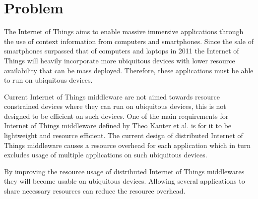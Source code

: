 \section{Problem}
\label{problem}
The Internet of Things aims to enable massive immersive applications through the use of context information from computers and smartphones. Since the sale of smartphones surpassed that of computers and laptops in 2011 \cite{canalsys} the Internet of Things will heavily incorporate more ubiquitous devices with lower resource availability that can be mass deployed. Therefore, these applications must be able to run on ubiquitous devices.

Current Internet of Things middleware are not aimed towards resource constrained devices where they can run on ubiquitous devices, this is not designed to be efficient on such devices. One of the main requirements for Internet of Things middleware defined by Theo Kanter et al. \cite{Kanter539187} is for it to be lightweight and resource efficient. The current design of distributed Internet of Things middleware causes a resource overhead for each application which in turn excludes usage of multiple applications on such ubiquitous devices. 

By improving the resource usage of distributed Internet of Things middlewares they will become usable on ubiquitous devices. Allowing several applications to share necessary resources can reduce the resource overhead. 



